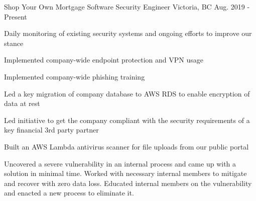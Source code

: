 


\begin{cventries}


\cventry
{Shop Your Own Mortgage} %
{Software Security Engineer} %
{Victoria, BC} %
{Aug. 2019 - Present} %
{ %
\begin{cvitems}
\item {Daily monitoring of existing security systems and ongoing efforts to improve our stance}
\item {Implemented company-wide endpoint protection and VPN usage}
\item {Implemented company-wide phishing training}
\item {Led a key migration of company database to AWS RDS to enable encryption of data at rest}
\item {Led initiative to get the company compliant with the security requirements of a key financial 3rd party partner}
\item {Built an AWS Lambda antivirus scanner for file uploads from our public portal}
\item {Uncovered a severe vulnerability in an internal process and came up with a solution in minimal time. Worked with necessary internal members to mitigate and recover with zero data loss. Educated internal members on the vulnerability and enacted a new process to eliminate it. }
\end{cvitems}
}



\end{cventries}
